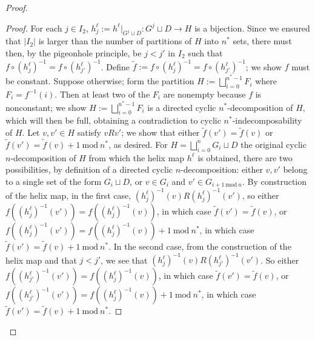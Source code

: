 \documentclass{amsart}
\theoremstyle{definition}
\theoremstyle{remark}
\numberwithin{equation}{section}
\begin{document}
\begin{proof}
\begin{proof}
    For each $j \in I_{2}$, $h_{j}^{\ell}:=h^{\ell}|_{G^{j} \sqcup D}: G^{j} \sqcup D \to H $ is a bijection. Since we ensured that $|I_{2}|$ is larger than the number of partitions of $H$ into $n^{*}$ sets, there must then, by the pigeonhole principle, be $j < j'$ in $I_{2}$ such that $f\circ (h^{\ell}_{j})^{-1}= f\circ (h^{\ell}_{j'})^{-1}$. Define $\tilde{f}:= f\circ (h^{\ell}_{j})^{-1}= f\circ (h^{\ell}_{j'})^{-1}$; we show $f$ must be constant. Suppose otherwise; form the partition $H := \bigsqcup^{n^{*}-1}_{i =0} F_{i}$ where $F_{i} = f^{-1}(i)$. Then at least two of the $F_{i}$ are nonempty because $f$ is nonconstant; we show $H := \bigsqcup^{n^{*}-1}_{i =0} F_{i}$ is a directed cyclic $n^{*}$-decomposition of $H$, which will then be full, obtaining a contradiction to cyclic $n^{*}$-indecomposability of $H$. Let $v, v' \in H$ satisfy $vRv'$; we show that either $\tilde{f}(v') = \tilde{f}(v)$ or $\tilde{f}(v') = \tilde{f}(v) + 1 \mathrm{\:mod\:} n^{*}$, as desired. For $H = \bigsqcup^{n}_{i=0} G_{i} \sqcup D$ the original cyclic $n$-decomposition of $H$ from which the helix map $h^{\ell}$ is obtained, there are two possibilities, by definition of a directed cyclic $n$-decomposition: either $v, v'$ belong to a single set of the form $G_{i} \sqcup D$, or $v \in G_{i}$ and $v' \in G_{i+1 \mathrm{\: mod \:} n}$. By construction of the helix map, in the first case, $(h^{\ell}_{j})^{-1}(v)R(h^{\ell}_{j})^{-1}(v')$, so either $f((h^{\ell}_{j})^{-1}(v'))=f((h^{\ell}_{j})^{-1}(v))$, in which case $\tilde{f}(v') = \tilde{f}(v)$, or $f((h^{\ell}_{j})^{-1}(v'))=f((h^{\ell}_{j})^{-1}(v))+1 \mathrm{\: mod \:} n^{*}$, in which case $\tilde{f}(v') = \tilde{f}(v) + 1 \mathrm{\:mod\:} n^{*}$. In the second case, from the construction of the helix map and that $j < j'$, we see that $(h_{j}^{\ell})^{-1}(v) R (h_{j'}^{\ell})^{-1}(v')$. So either $f((h^{\ell}_{j'})^{-1}(v'))=f((h^{\ell}_{j})^{-1}(v))$, in which case $\tilde{f}(v') = \tilde{f}(v)$, or $f((h^{\ell}_{j'})^{-1}(v'))=f((h^{\ell}_{j})^{-1}(v))+1 \mathrm{\: mod \:} n^{*}$, in which case $\tilde{f}(v') = \tilde{f}(v) + 1 \mathrm{\:mod\:} n^{*}$.
\end{proof}




\end{proof}
\end{document}
